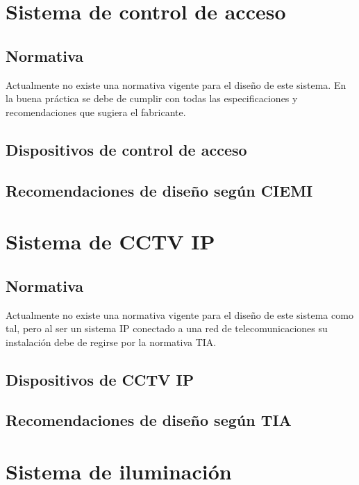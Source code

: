 \newpage


\section{Sistema de control de acceso}

\subsection{Normativa}

Actualmente no existe una normativa vigente para el diseño de este sistema. En la buena práctica se debe de cumplir con todas las especificaciones y recomendaciones que sugiera el fabricante.


\subsection{Dispositivos de control de acceso}

\subsection{Recomendaciones de diseño según CIEMI}


\newpage


\section{Sistema de CCTV IP}

\subsection{Normativa}

Actualmente no existe una normativa vigente para el diseño de este sistema como tal, pero al ser un sistema IP conectado a una red de telecomunicaciones su instalación debe de regirse por la normativa TIA.


\subsection{Dispositivos de CCTV IP}

\subsection{Recomendaciones de diseño según TIA}


\newpage


\section{Sistema de iluminación}

